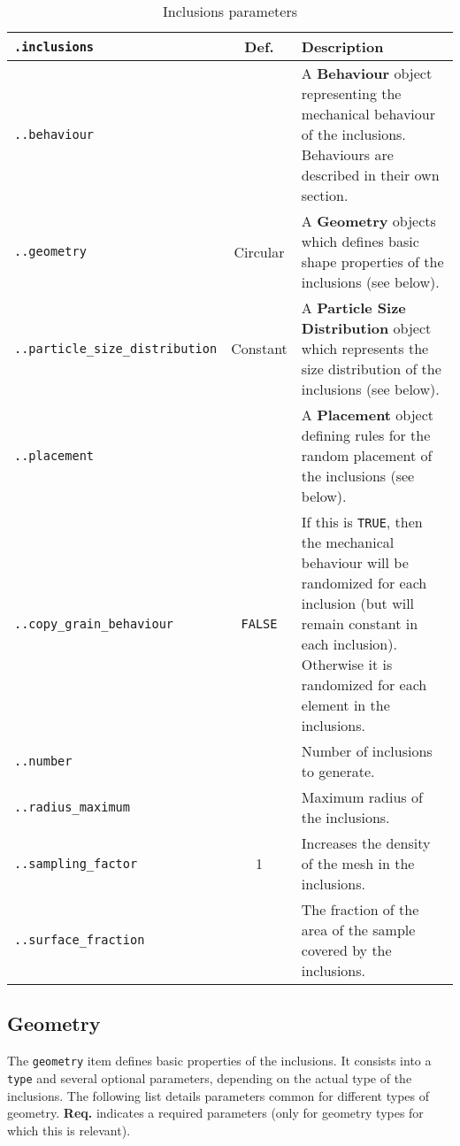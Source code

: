 \documentclass[10pt]{article}
\begin{document}
\begin{table}[h!]
\begin{tabularx}{\textwidth}{lcX}
\verb+.inclusions+ &  Def. & Description \\
\hline
\verb+..behaviour+ & & A \textbf{Behaviour} object representing the mechanical behaviour of the inclusions. Behaviours are described in their own section. \\
\verb+..geometry+ & Circular & A \textbf{Geometry} objects which defines basic shape properties of the inclusions (see below).\\
\verb+..particle_size_distribution+ & Constant & A \textbf{Particle Size Distribution} object which represents the size distribution of the inclusions (see below).\\
\verb+..placement+ & & A \textbf{Placement} object defining rules for the random placement of the inclusions (see below). \\	
\verb+..copy_grain_behaviour+ & \verb+FALSE+ & If this is \verb+TRUE+, then the mechanical behaviour will be randomized for each inclusion (but will remain constant in each inclusion). Otherwise it is randomized for each element in the inclusions.\\
\verb+..number+ &  & Number of inclusions to generate.\\
\verb+..radius_maximum+ &  & Maximum radius of the inclusions.\\
\verb+..sampling_factor+ & 1 & Increases the density of the mesh in the inclusions.\\
\verb+..surface_fraction+ &  & The fraction of the area of the sample covered by the inclusions.\\
\hline
\end{tabularx}
\caption{Inclusions parameters}
\end{table}

\subsection{Geometry}

The \verb+geometry+ item defines basic properties of the inclusions.
It consists into a \verb+type+ and several optional parameters, depending on the actual type of the inclusions.
The following list details parameters common for different types of geometry.
\textbf{Req.} indicates a required parameters (only for geometry types for which this is relevant).
\end{document}
